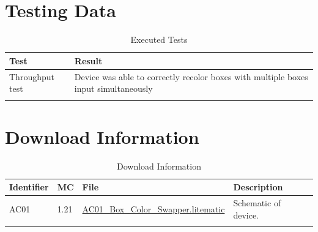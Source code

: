\documentclass[10pt]{datasheet}
\begin{document}
\section{Testing Data}
\begin{table}[H]
\caption{Executed Tests}
\begin{tabularx}{\textwidth}{l | X}
    \thickhline
    \textbf{Test} & \textbf{Result} \\
    \hline
    Throughput test & Device was able to correctly recolor boxes with multiple boxes input simultaneously \\
    \thickhline
\end{tabularx}
\end{table}

\section{Download Information}
\begin{table}[H]
    \caption{Download Information}
    \begin{tabularx}{\textwidth}{l | l | l | X}
        \thickhline
        \textbf{Identifier} & \textbf{MC} & \textbf{File} & \textbf{Description} \\
        \hline
        AC01 & 1.21 & \href{https://github.com/Soontech-Annals/Archive/blob/b56572c0d2b4f182d9e9d41449d8cb2963b923ae/Archive/autocrafting/AC01\%20Box\%20Color\%20Swapper/AC01\_Box\_Color\_Swapper.litematic?raw=1}{AC01\_Box\_Color\_Swapper.litematic} & Schematic of device. \\
        \hline
        \thickhline
    \end{tabularx}
\end{table}
\end{document}
